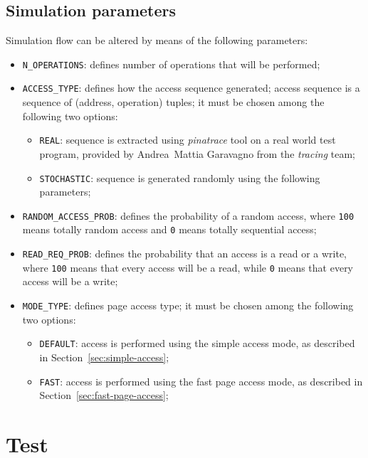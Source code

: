 \documentclass[a4paper,12pt]{article}
\begin{document}
\subsection{Simulation parameters}
Simulation flow can be altered by means of the following parameters:

\begin{itemize}
  \item \texttt{N\_OPERATIONS}: defines number of operations that will be performed;
  \item \texttt{ACCESS\_TYPE}: defines how the access sequence generated; access sequence is a sequence of (address, operation) tuples; it must be chosen among the following two options:
  \begin{itemize}
    \item \texttt{REAL}: sequence is extracted using \emph{pinatrace} tool on a real world test program, provided by Andrea~Mattia Garavagno from the \emph{tracing} team;
    \item \texttt{STOCHASTIC}: sequence is generated randomly using the following parameters;
  \end{itemize}
  \item \texttt{RANDOM\_ACCESS\_PROB}: defines the probability of a random access, where \texttt{100} means totally random access and \texttt{0} means totally sequential access;
  \item \texttt{READ\_REQ\_PROB}: defines the probability that an access is a read or a write, where \texttt{100} means that every access will be a read, while \texttt{0} means that every access will be a write;
  \item \texttt{MODE\_TYPE}: defines page access type; it must be chosen among the following two options:
  \begin{itemize}
    \item \texttt{DEFAULT}: access is performed using the simple access mode, as described in Section~\ref{sec:simple-access};
    \item \texttt{FAST}: access is performed using the fast page access mode, as described in Section~\ref{sec:fast-page-access};
  \end{itemize}
\end{itemize}

\section{Test}
\end{document}
